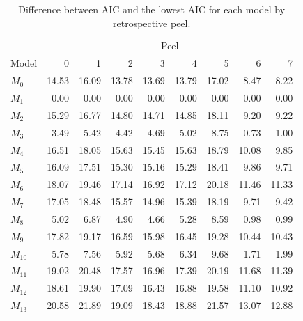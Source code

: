 \documentclass[
]{article}
\begin{document}
\begin{table}

\caption{\label{tab:diff-aic-table}Difference between AIC and the lowest AIC for each model by retrospective peel.}
\centering
\begin{tabular}[t]{lrrrrrrrr}
\toprule
\multicolumn{1}{c}{ } & \multicolumn{8}{c}{Peel} \\
\cmidrule(l{3pt}r{3pt}){2-9}
Model & 0 & 1 & 2 & 3 & 4 & 5 & 6 & 7\\
\midrule
$M_{0}$ & 14.53 & 16.09 & 13.78 & 13.69 & 13.79 & 17.02 & 8.47 & 8.22\\
$M_{1}$ & 0.00 & 0.00 & 0.00 & 0.00 & 0.00 & 0.00 & 0.00 & 0.00\\
$M_{2}$ & 15.29 & 16.77 & 14.80 & 14.71 & 14.85 & 18.11 & 9.20 & 9.22\\
$M_{3}$ & 3.49 & 5.42 & 4.42 & 4.69 & 5.02 & 8.75 & 0.73 & 1.00\\
$M_{4}$ & 16.51 & 18.05 & 15.63 & 15.45 & 15.63 & 18.79 & 10.08 & 9.85\\
\addlinespace
$M_{5}$ & 16.09 & 17.51 & 15.30 & 15.16 & 15.29 & 18.41 & 9.86 & 9.71\\
$M_{6}$ & 18.07 & 19.46 & 17.14 & 16.92 & 17.12 & 20.18 & 11.46 & 11.33\\
$M_{7}$ & 17.05 & 18.48 & 15.57 & 14.96 & 15.39 & 18.19 & 9.71 & 9.42\\
$M_{8}$ & 5.02 & 6.87 & 4.90 & 4.66 & 5.28 & 8.59 & 0.98 & 0.99\\
$M_{9}$ & 17.82 & 19.17 & 16.59 & 15.98 & 16.45 & 19.28 & 10.44 & 10.43\\
\addlinespace
$M_{10}$ & 5.78 & 7.56 & 5.92 & 5.68 & 6.34 & 9.68 & 1.71 & 1.99\\
$M_{11}$ & 19.02 & 20.48 & 17.57 & 16.96 & 17.39 & 20.19 & 11.68 & 11.39\\
$M_{12}$ & 18.61 & 19.90 & 17.09 & 16.43 & 16.88 & 19.58 & 11.10 & 10.92\\
$M_{13}$ & 20.58 & 21.89 & 19.09 & 18.43 & 18.88 & 21.57 & 13.07 & 12.88\\
\bottomrule
\end{tabular}
\end{table}
\end{document}

